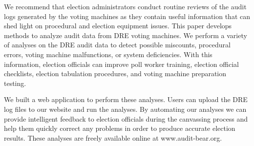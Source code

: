 We recommend that election administrators conduct routine reviews of the audit
logs generated by the voting machines as they contain useful information that
can shed light on procedural and election equipment issues. This paper develops
methods to analyze audit data from DRE voting machines. We perform a variety of
analyses 
on the DRE audit data to detect possible miscounts, procedural errors, voting
machine malfunctions, or system deficiencies. With this information, election
officials can improve poll worker training, election official checklists,
election tabulation procedures, and voting machine preparation testing.

We built a web application to perform these analyses. Users can upload the DRE
log files to our website and run the analyses. By 
automating our analyses we can provide intelligent feedback to election
officials during the canvassing process and help them quickly correct any
problems in order to produce accurate election results. These analyses are
freely available online at www.audit-bear.org.

